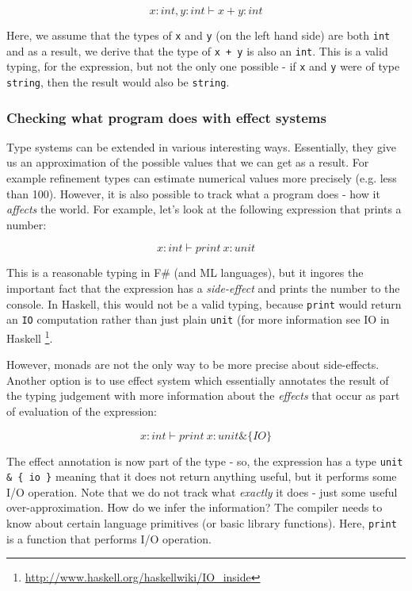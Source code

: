 \begin{equation}
x:int, y:int \vdash x+y : int
\end{equation}

Here, we assume that the types of \texttt{x} and \texttt{y} (on the left hand side) are both \texttt{int} and as a result,
we derive that the type of \texttt{x + y} is also an \texttt{int}. This is a valid typing, for the expression, but
not the only one possible - if \texttt{x} and \texttt{y} were of type \texttt{string}, then the result would also be 
 \texttt{string}.

\subsubsection{Checking what program does with effect systems}

Type systems can be extended in various interesting ways. Essentially, they give us an approximation
of the possible values that we can get as a result. For example refinement types \cite{xx}
can estimate numerical values more precisely (e.g. less than 100). However, it is also possible to 
track what a program does - how it \emph{affects} the world. For example, let's look at the following
expression that prints a number:

\begin{equation}
x:int \vdash print~x : unit
\end{equation}

This is a reasonable typing in F\# (and ML languages), but it ingores the important fact that the 
expression has a \emph{side-effect} and prints the number to the console. In Haskell, this would not be
a valid typing, because \texttt{print} would return an \texttt{IO} computation rather than just plain \texttt{unit} (for
more information see IO in Haskell \footnote{\url{http://www.haskell.org/haskellwiki/IO_inside}}.

However, monads are not the only way to be more precise about side-effects. Another option is
to use effect system \cite{xx} which essentially annotates the 
result of the typing judgement with more information about the \emph{effects} that occur as part of
evaluation of the expression:

\begin{equation}
x:int \vdash print~x : unit \& \{ IO \}
\end{equation}

The effect annotation is now part of the type - so, the expression has a type \texttt{unit \& \{ io \}} meaning
that it does not return anything useful, but it performs some I/O operation. Note that we do not track
what \emph{exactly} it does - just some useful over-approximation. How do we infer the information?
The compiler needs to know about certain language primitives (or basic library functions). Here, 
\texttt{print} is a function that performs I/O operation.

